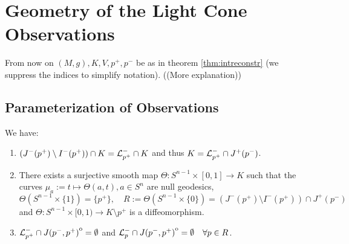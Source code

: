 \section{Geometry of the Light Cone Observations}
From now on $(M,g), K, V, p^+,p^-$ be as in theorem \ref{thm:intreconstr} (we suppress the indices to simplify notation). ((More explanation))

\subsection{Parameterization of Observations}
\begin{lemma}\label{lem:Kcharact}
    We have:
    \begin{enumerate}[label={\textnormal{(\arabic*)}}]
        \item $(J^-(p^+)\setminus I^-(p^+)) \cap K = \mathcal{L}^-_{p^+} \cap K$ and thus $K = \mathcal{L}^-_{p^+} \cap J^+(p^-)$.
        \item There exists a surjective smooth map $\Theta:S^{n-1}\times[0,1] \to K$ such that the curves $\mu_a:=t\mapsto\Theta(a,t), a\in S^n$ are null geodesics, 
        \[\Theta(S^{n-1}\times\{1\}) = \{p^+\}, \quad R:=\Theta(S^{n-1}\times\{0\}) = (J^-(p^+)\setminus I^-(p^+)) \cap J^+(p^-)\]
        and $\Theta:S^{n-1}\times[0,1)\to K\setminus p^+$ is a diffeomorphism.
        \item $\mathcal{L}^-_{p^+}\cap {\kern0ptJ(p^-,p^+)}^{\mathrm{o}} = \emptyset$ and $\mathcal{L}^-_{p} \cap {\kern0ptJ(p^-,p^+)}^{\mathrm{o}} = \emptyset \quad \forall p\in R$.
    \end{enumerate}
\end{lemma}
